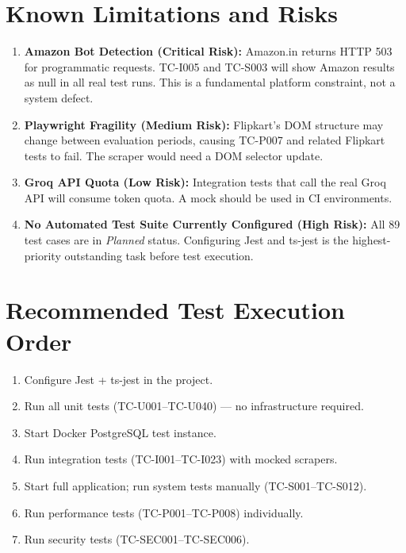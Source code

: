 \documentclass[12pt,a4paper]{report}
\begin{document}
\section{Known Limitations and Risks}

\begin{enumerate}[noitemsep]
  \item \textbf{Amazon Bot Detection (Critical Risk):} Amazon.in returns HTTP 503
        for programmatic requests. TC-I005 and TC-S003 will show Amazon results
        as null in all real test runs. This is a fundamental platform constraint,
        not a system defect.

  \item \textbf{Playwright Fragility (Medium Risk):} Flipkart's DOM structure
        may change between evaluation periods, causing TC-P007 and related
        Flipkart tests to fail. The scraper would need a DOM selector update.

  \item \textbf{Groq API Quota (Low Risk):} Integration tests that call the
        real Groq API will consume token quota. A mock should be used in CI
        environments.

  \item \textbf{No Automated Test Suite Currently Configured (High Risk):}
        All 89 test cases are in \textit{Planned} status. Configuring Jest and
        ts-jest is the highest-priority outstanding task before test execution.
\end{enumerate}

\section{Recommended Test Execution Order}
\begin{enumerate}[noitemsep]
  \item Configure Jest + ts-jest in the project.
  \item Run all unit tests (TC-U001--TC-U040) --- no infrastructure required.
  \item Start Docker PostgreSQL test instance.
  \item Run integration tests (TC-I001--TC-I023) with mocked scrapers.
  \item Start full application; run system tests manually (TC-S001--TC-S012).
  \item Run performance tests (TC-P001--TC-P008) individually.
  \item Run security tests (TC-SEC001--TC-SEC006).
\end{enumerate}
\end{document}
